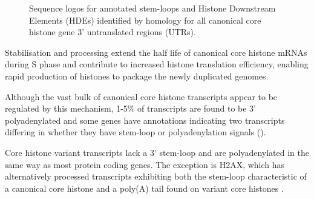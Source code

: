   \begin{figure}
    \centering
    \hfill
    \caption{%
      Sequence logos for
       annotated stem-loops and
        Histone Downstream Elements (HDEs)
      identified by homology
      for all canonical core histone gene 3' untranslated regions (UTRs).
    }
  \end{figure}

  Stabilisation and processing extend the half life of canonical core histone \mbox{mRNAs}
  during S phase and contribute to increased histone translation efficiency,
  enabling rapid production of histones to package the newly duplicated genomes.

  Although the vast bulk of canonical core histone transcripts
  appear to be regulated by this mechanism,
  1-5\% of transcripts are found to be 3' polyadenylated \citep{YangGenomeBiol2011}
  and some genes have annotations indicating two transcripts
  differing in whether they have stem-loop or polyadenylation signals ().

  Core histone variant transcripts lack a 3' stem-loop and are
  polyadenylated in the same way as most protein coding genes.
  The exception is H2AX, which has alternatively processed transcripts
  exhibiting both the stem-loop characteristic of a canonical core histone
  and a poly(A) tail found on variant core histones \citep{HTwoAX-transcripts,our-H2AX-review}.

